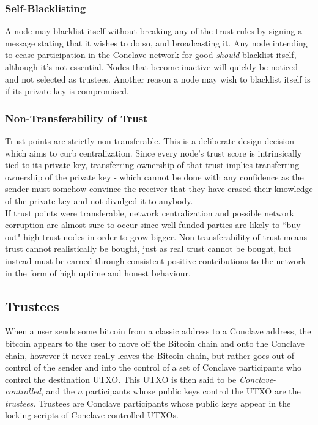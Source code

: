 \documentclass{report}
\begin{document}
		\subsubsection{Self-Blacklisting}
		A node may blacklist itself without breaking any of the trust rules by signing a message stating that it wishes to do so, and broadcasting it. Any node intending to cease participation in the Conclave network for good \textit{should} blacklist itself, although it's not essential. Nodes that become inactive will quickly be noticed and not selected as trustees. Another reason a node may wish to blacklist itself is if its private key is compromised.
		
		\subsubsection{Non-Transferability of Trust}
		Trust points are strictly non-transferable.  This is a deliberate design decision which aims to curb centralization.  Since every node's trust score is intrinsically tied to its private key, transferring ownership of that trust implies transferring ownership of the private key - which cannot be done with any confidence as the sender must somehow convince the receiver that they have erased their knowledge of the private key and not divulged it to anybody. \\
		
		If trust points were transferable, network centralization and possible network corruption are almost sure to occur since well-funded parties are likely to ``buy out"  high-trust nodes in order to grow bigger. Non-transferability of trust means trust cannot realistically be bought, just as real trust cannot be bought, but instead must be earned through consistent positive contributions to the network in the form of high uptime and honest behaviour.

		\subsection{Trustees}
			When a user sends some bitcoin from a classic address to a Conclave address, the bitcoin appears to the user to move off the Bitcoin chain and onto the Conclave chain, however it never really leaves the Bitcoin chain, but rather goes out of control of the sender and into the control of a set of Conclave participants who control the destination UTXO.  This UTXO is then said to be \textit{Conclave-controlled}, and the $n$ participants whose public keys control the UTXO are the \textit{trustees}. Trustees are Conclave participants whose public keys appear in the locking scripts of Conclave-controlled UTXOs. \\
			
\end{document}
